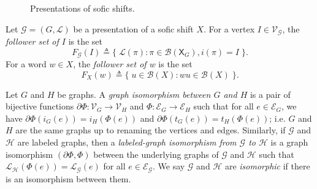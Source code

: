 \documentclass[hidelinks]{report}
\newcommand{\Lc}{\mathcal{L}}  %
\newcommand{\Gc}{\mathcal{G}}  %
\newcommand{\Hc}{\mathcal{H}}  %
\newcommand{\Vc}{\mathcal{V}}
\newcommand{\Ec}{\mathcal{E}}
\newcommand{\Bc}{\mathcal{B}}
\newcommand{\shift}[1]{\mathsf{X}_{#1}}
\newcommand{\term}[1]{\textit{#1}}
\theoremstyle{definition}
\begin{document}
\begin{figure}
\begin{subfigure}{0.31\textwidth}
\begin{tikzpicture}
        \end{tikzpicture} 
        \caption{}\label{nonminimaleven}
    \end{subfigure}
    \begin{subfigure}{0.31\textwidth}
        \caption{}\label{nondeterministiceven}
    \end{subfigure}
    \caption{Presentations of sofic shifts.}
\end{figure}

\begin{definition}
    Let \(\Gc = (G, \Lc)\) be a presentation of a sofic shift \(X\). For a vertex \(I \in \Vc_\Gc\), the 
    \term{follower set of \(I\)} is the set 
    \[F_\Gc(I) \triangleq \big\{ \; \Lc(\pi) : \pi \in \Bc(\shift{G}), i(\pi) = I \; \big\}.\]
    For a word \(w \in X\), the \term{follower set of \(w\)}
    is the set 
    \[F_X(w) \triangleq \big\{ \; u \in \Bc(X) : wu \in \Bc(X) \; \big\}.\]
\end{definition}

Let \(G\) and \(H\) be graphs. A \term{graph isomorphism between \(G\) and \(H\)}
is a pair of bijective functions \(\partial\Phi : \Vc_G \to \Vc_H\) and \(\Phi : \Ec_G \to \Ec_H\)
such that for all \(e \in \Ec_G\), we have \(\partial\Phi(i_G(e)) = i_H(\Phi(e))\)
and \(\partial\Phi(t_G(e)) = t_H(\Phi(e))\); i.e. \(G\) and \(H\) are the 
same graphs up to renaming the vertices and edges. Similarly, if \(\Gc\)
and \(\Hc\) are labeled graphs, then a \term{labeled-graph isomorphism from \(\Gc\) to \(\Hc\)}
is a graph isomorphism \((\partial\Phi, \Phi)\) between the underlying graphs of \(\Gc\)
and \(\Hc\) such that 
\(\Lc_\Hc(\Phi(e)) = \Lc_\Gc(e)\) for all \(e \in \Ec_\Gc\). We say 
\(\Gc\) and \(\Hc\) are \term{isomorphic} if there is an isomorphism between them.
\end{document}
